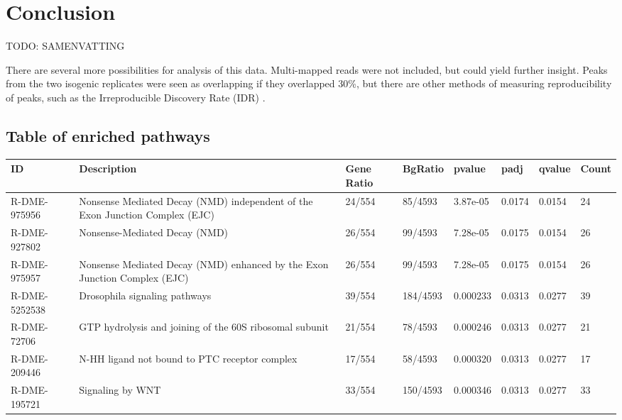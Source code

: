 \documentclass{article}
\begin{document}
{\section{Conclusion}
TODO: SAMENVATTING

There are several more possibilities for analysis of this data. Multi-mapped reads were not included, but could yield further insight\cite{chung2011discovering}. Peaks from the two isogenic replicates were seen as overlapping if they overlapped 30\%, but there are other methods of measuring reproducibility of peaks, such as the Irreproducible Discovery Rate (IDR) \cite{li2011measuring}. 

\printbibliography

\appendix

\begin{landscape}
\section{Table of enriched pathways}
\label{app:pathways}
\begin{table}[!ht]
    \centering
    \begin{tabular}{|m{3cm}|m{6cm}|m{1cm}|m{1.5cm}|m{2cm}|m{1cm}|m{1cm}|m{1cm}|}
    \hline
        ID & Description & Gene Ratio & BgRatio & pvalue & padj & qvalue & Count \\ \hline
        R-DME-975956 & Nonsense Mediated Decay (NMD) independent of the Exon Junction Complex (EJC) & 24/554 & 85/4593 & 3.87e-05 & 0.0174 & 0.0154 & 24 \\ \hline
        R-DME-927802 & Nonsense-Mediated Decay (NMD) & 26/554 & 99/4593 & 7.28e-05 & 0.0175 & 0.0154 & 26 \\ \hline
        R-DME-975957 & Nonsense Mediated Decay (NMD) enhanced by the Exon Junction Complex (EJC) & 26/554 & 99/4593 & 7.28e-05 & 0.0175 & 0.0154 & 26 \\ \hline
        R-DME-5252538 & Drosophila signaling pathways & 39/554 & 184/4593 & 0.000233 & 0.0313 & 0.0277 & 39 \\ \hline
        R-DME-72706 & GTP hydrolysis and joining of the 60S ribosomal subunit & 21/554 & 78/4593 & 0.000246 & 0.0313 & 0.0277 & 21 \\ \hline
        R-DME-209446 & N-HH ligand not bound to PTC receptor complex & 17/554 & 58/4593 & 0.000320 & 0.0313 & 0.0277 & 17 \\ \hline
        R-DME-195721 & Signaling by WNT & 33/554 & 150/4593 & 0.000346 & 0.0313 & 0.0277 & 33 \\ \hline

\end{tabular}
\end{table}
\end{landscape}}
\end{document}
